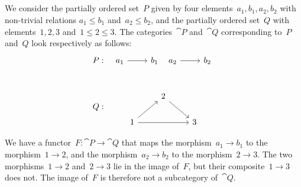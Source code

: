 \subsection{}

We consider the partially ordered set~$P$ given by four elements~$a_1, b_1, a_2, b_2$ with non-trivial relations $a_1 ≤ b_1$ and~$a_2 ≤ b_2$, and the partially ordered set~$Q$ with elements~$1, 2, 3$ and~$1 ≤ 2 ≤ 3$.
The categories~$\cat{P}$ and~$\cat{Q}$ corresponding to~$P$ and~$Q$ look respectively as follows:
\[
	\begin{array}{lc}
		P:
		&
		\begin{tikzcd}
			a_1
			\arrow{r}
			&
			b_1
			&[-2em]
			a_2
			\arrow{r}
			&
			b_2
		\end{tikzcd}
		\\[3em]
		Q:
		&
		\begin{tikzcd}
			{}
			&
			2
			\arrow{dr}
			&
			{}
			\\
			1
			\arrow{ur}
			\arrow{rr}
			&
			{}
			&
			3
		\end{tikzcd}
	\end{array}
\]

We have a functor~$F \colon \cat{P} \to \cat{Q}$ that maps the morphism~$a_1 \to b_1$ to the morphism~$1 \to 2$, and the morphism~$a_2 \to b_2$ to the morphism~$2 \to 3$.
The two morphisms~$1 \to 2$ and~$2 \to 3$ lie in the image of~$F$, but their composite~$1 \to 3$ does not.
The image of~$F$ is therefore not a subcategory of~$\cat{Q}$.
